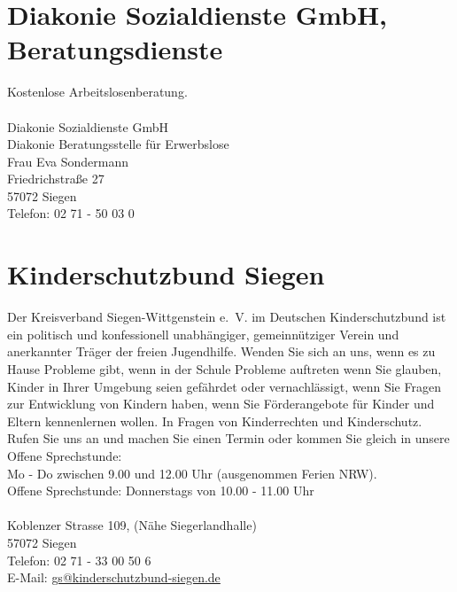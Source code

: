 \section{Diakonie Sozialdienste GmbH, Beratungsdienste}
Kostenlose Arbeitslosenberatung.\\
\\
Diakonie Sozialdienste GmbH\\
Diakonie  Beratungsstelle für Erwerbslose\\
Frau Eva Sondermann \\
Friedrichstraße 27\\
57072 Siegen \\
Telefon: 02 71 - 50 03 0 

\section{Kinderschutzbund Siegen}
Der Kreisverband Siegen-Wittgenstein e.~V. im Deutschen Kinderschutzbund ist ein politisch und konfessionell unabhängiger, gemeinnütziger Verein und anerkannter Träger der freien Jugendhilfe. Wenden Sie sich an uns, wenn es zu Hause Probleme 
gibt, wenn in der Schule Probleme auftreten wenn Sie glauben, Kinder in Ihrer Umgebung seien gefährdet oder vernachlässigt, wenn Sie Fragen zur Entwicklung von Kindern haben, wenn Sie Förderangebote für Kinder und Eltern kennenlernen wollen. In Fragen von Kinderrechten und Kinderschutz. Rufen Sie uns an und machen Sie einen Termin oder kommen Sie gleich in unsere Offene Sprechstunde: \\
Mo - Do zwischen 9.00 und 12.00 Uhr (ausgenommen Ferien NRW). \\
Offene Sprechstunde: Donnerstags von 10.00 - 11.00 Uhr  \\
\\ 
Koblenzer Strasse 109,  (Nähe Siegerlandhalle)\\ 
57072 Siegen\\
Telefon: 02 71 - 33 00 50 6\\
E-Mail: \href{mailto:gs@kinderschutzbund-siegen.de}{gs@kinderschutzbund-siegen.de} 

